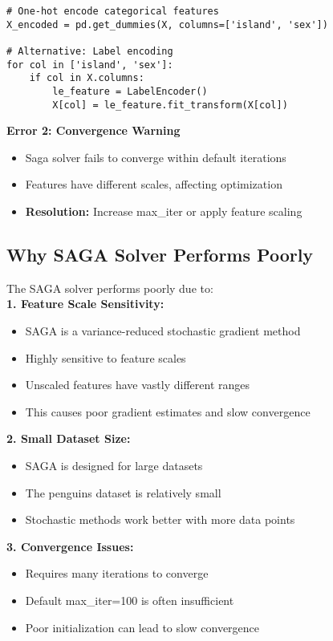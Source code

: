 \documentclass[12pt]{article}
\begin{document}
\begin{lstlisting}[caption={Handling categorical features}]
# One-hot encode categorical features
X_encoded = pd.get_dummies(X, columns=['island', 'sex'])

# Alternative: Label encoding
for col in ['island', 'sex']:
    if col in X.columns:
        le_feature = LabelEncoder()
        X[col] = le_feature.fit_transform(X[col])
\end{lstlisting}

\textbf{Error 2: Convergence Warning}
\begin{itemize}
    \item Saga solver fails to converge within default iterations
    \item Features have different scales, affecting optimization
    \item \textbf{Resolution:} Increase max\_iter or apply feature scaling
\end{itemize}

\subsection{Why SAGA Solver Performs Poorly}

The SAGA solver performs poorly due to:\\

\textbf{1. Feature Scale Sensitivity:}
\begin{itemize}
    \item SAGA is a variance-reduced stochastic gradient method
    \item Highly sensitive to feature scales
    \item Unscaled features have vastly different ranges
    \item This causes poor gradient estimates and slow convergence
\end{itemize}

\textbf{2. Small Dataset Size:}
\begin{itemize}
    \item SAGA is designed for large datasets
    \item The penguins dataset is relatively small
    \item Stochastic methods work better with more data points
\end{itemize}

\textbf{3. Convergence Issues:}
\begin{itemize}
    \item Requires many iterations to converge
    \item Default max\_iter=100 is often insufficient
    \item Poor initialization can lead to slow convergence
\end{itemize}
\end{document}
